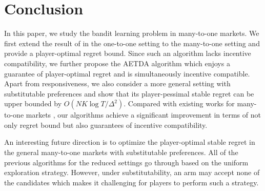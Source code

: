 \documentclass[letterpaper]{article} %
\begin{document}
\section{Conclusion}\label{sec:conclusion}


In this paper, we study the bandit learning problem in many-to-one markets.
We first extend the result of \citet{kong2023player} in the one-to-one setting to the many-to-one setting and provide a player-optimal regret bound. Since such an algorithm lacks incentive compatibility, we further propose the AETDA algorithm which enjoys a guarantee of player-optimal regret and is simultaneously incentive compatible.
Apart from responsiveness, we also consider a more general setting with substitutable preferences and show that its player-pessimal stable regret can be upper bounded by $O(NK\log T/\Delta^2)$.
Compared with existing works for many-to-one markets \citep{wang2022bandit}, our algorithms achieve a significant improvement in terms of not only regret bound but also guarantees of incentive compatibility.


An interesting future direction is to optimize the player-optimal stable regret in the general many-to-one markets with substitutable preferences. All of the previous algorithms for the reduced settings go through based on the uniform exploration strategy. However, under substitutability, an arm may accept none of the candidates which makes it challenging for players to perform such a strategy.




\end{document}
